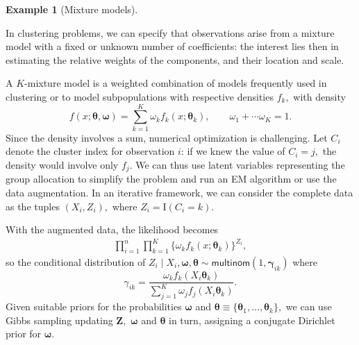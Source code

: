 \documentclass[
  11pt,
  letterpaper,
]{scrbook}
\theoremstyle{plain}
\theoremstyle{plain}
\theoremstyle{plain}
\theoremstyle{definition}
\theoremstyle{definition}
\newtheorem{example}{Example}[chapter]
\theoremstyle{definition}
\theoremstyle{remark}
\begin{document}
\begin{example}[Mixture
models]\protect\hypertarget{exm-mixture}{}\label{exm-mixture}

In clustering problems, we can specify that observations arise from a
mixture model with a fixed or unknown number of coefficients: the
interest lies then in estimating the relative weights of the components,
and their location and scale.

A \(K\)-mixture model is a weighted combination of models frequently
used in clustering or to model subpopulations with respective densities
\(f_k,\) with density
\[f(x; \boldsymbol{\theta}, \boldsymbol{\omega}) = \sum_{k=1}^K \omega_kf_k(x; \boldsymbol{\theta}_k), \qquad \omega_1 + \cdots \omega_K=1.\]
Since the density involves a sum, numerical optimization is challenging.
Let \(C_i\) denote the cluster index for observation \(i\): if we knew
the value of \(C_i =j,\) the density would involve only \(f_j.\) We can
thus use latent variables representing the group allocation to simplify
the problem and run an EM algorithm or use the data augmentation. In an
iterative framework, we can consider the complete data as the tuples
\((X_i, Z_i),\) where \(Z_i = \mathrm{I}(C_i=k).\)

With the augmented data, the likelihood becomes \begin{align*}
\prod_{i=1}^n \prod_{k=1}^K \{\omega_kf_k(x; \boldsymbol{\theta}_k)\}^{Z_i},
\end{align*} so the conditional distribution of
\(Z_i \mid X_i, \boldsymbol{\omega}, \boldsymbol{\theta} \sim \mathsf{multinom}(1, \boldsymbol{\gamma}_{ik})\)
where
\[\gamma_{ik} = \frac{\omega_k f_k(X_i\boldsymbol{\theta}_k)}{\sum_{j=1}^K \omega_jf_j(X_i\boldsymbol{\theta}_k)}.\]
Given suitable priors for the probabilities \(\boldsymbol{\omega}\) and
\(\boldsymbol{\theta} \equiv \{\boldsymbol{\theta}_1, \ldots, \boldsymbol{\theta}_k\},\)
we can use Gibbs sampling updating \(\boldsymbol{Z},\)
\(\boldsymbol{\omega}\) and \(\boldsymbol{\theta}\) in turn, assigning a
conjugate Dirichlet prior for \(\boldsymbol{\omega}.\)

\end{example}
\end{document}
